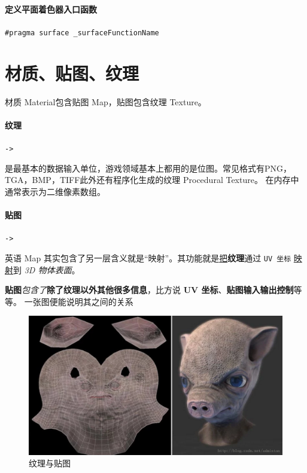 \documentclass[UTF8,a4paper,12pt]{ctexbook}
\begin{document}
		\paragraph{定义平面着色器入口函数}
			\verb|#pragma surface _surfaceFunctionName |
			
		
		
			
	\section{材质、贴图、纹理}
			材质 Material包含贴图 Map，贴图包含纹理 Texture。
			
			\paragraph{纹理}\verb|->|
			
				是最基本的数据输入单位，游戏领域基本上都用的是位图。常见格式有PNG，TGA，BMP，TIFF此外还有程序化生成的纹理 Procedural Texture。 
				在内存中通常表示为二维像素数组。
				
			\paragraph{贴图}\verb|->|
			
				英语 Map 其实包含了另一层含义就是“映射”。其功能就是\underline{把}\textbf{纹理}通过 \verb|UV 坐标| \underline{映射}到 \textit{3D 物体表面}。
				
				\textbf{贴图}\textit{包含了}\textbf{除了纹理以外其他很多信息}，比方说 \textbf{UV 坐标}、\textbf{贴图输入输出控制}等等。 
				一张图便能说明其之间的关系 
				\begin{figure}[H]
					\centering
					\includegraphics[scale=0.57]{Texture}
					\caption{纹理与贴图}
				\end{figure}
				
\end{document}
